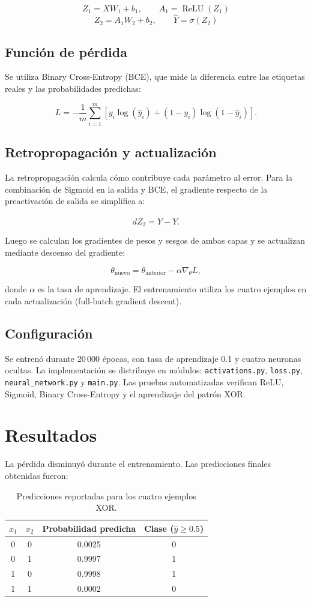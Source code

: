 \documentclass[11pt,a4paper]{article}
\begin{document}
\[
Z_1=XW_1+b_1,\qquad A_1=\operatorname{ReLU}(Z_1)
\]
\[
Z_2=A_1W_2+b_2,\qquad \hat{Y}=\sigma(Z_2)
\]

\subsection{Función de pérdida}
Se utiliza Binary Cross-Entropy (BCE), que mide la diferencia entre las etiquetas reales y las probabilidades predichas:

\[
L=-\frac{1}{m}\sum_{i=1}^{m}
\left[y_i\log(\hat y_i)+(1-y_i)\log(1-\hat y_i)\right].
\]

\subsection{Retropropagación y actualización}
La retropropagación calcula cómo contribuye cada parámetro al error. Para la combinación de Sigmoid en la salida y BCE, el gradiente respecto de la preactivación de salida se simplifica a:

\[
dZ_2=\hat{Y}-Y.
\]

Luego se calculan los gradientes de pesos y sesgos de ambas capas y se actualizan mediante descenso del gradiente:

\[
\theta_{\text{nuevo}}=\theta_{\text{anterior}}-\alpha\nabla_\theta L,
\]

donde $\alpha$ es la tasa de aprendizaje. El entrenamiento utiliza los cuatro ejemplos en cada actualización (full-batch gradient descent).

\subsection{Configuración}
Se entrenó durante 20\,000 épocas, con tasa de aprendizaje 0.1 y cuatro neuronas ocultas. La implementación se distribuye en módulos: \texttt{activations.py}, \texttt{loss.py}, \texttt{neural\_network.py} y \texttt{main.py}. Las pruebas automatizadas verifican ReLU, Sigmoid, Binary Cross-Entropy y el aprendizaje del patrón XOR.

\section{Resultados}
La pérdida disminuyó durante el entrenamiento. Las predicciones finales obtenidas fueron:

\begin{table}[H]
\centering
\begin{tabular}{cc|c|c}
\toprule
$x_1$ & $x_2$ & Probabilidad predicha & Clase ($\hat y\geq 0.5$)\\
\midrule
0 & 0 & 0.0025 & 0\\
0 & 1 & 0.9997 & 1\\
1 & 0 & 0.9998 & 1\\
1 & 1 & 0.0002 & 0\\
\bottomrule
\end{tabular}
\caption{Predicciones reportadas para los cuatro ejemplos XOR.}
\end{table}
\end{document}
